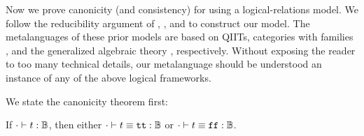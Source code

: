 Now we prove canonicity (and consistency) for \TT using a logical-relations model.
We follow the reducibility argument of
\citet{kaposi2019gluing}, \citet{coquand2018canonicity}, and \citet{sterling2019algebraic}
to construct our model.
The meta\-languages of these prior models are based on QIITs, categories with
families \cite{dybjer1995internal}, and the generalized algebraic theory
\cite{cartmell1986generalised}, respectively.
Without exposing the reader to too many technical details, our meta\-language
should be understood an instance of any of the above logical frameworks.

We state the canonicity theorem first:

\begin{theorem}[Canonicity]
\label{thm:canonicity-appendix}
  If $ {\cdot} \vdash {t} : {\mathbb{B}} $, then either $ {\cdot} \vdash {t \equiv \ensuremath{\texttt{tt}}} : {\mathbb{B}} $ or $ {\cdot} \vdash {t \equiv \ensuremath{\texttt{ff}}} : {\mathbb{B}} $.
\end{theorem}

